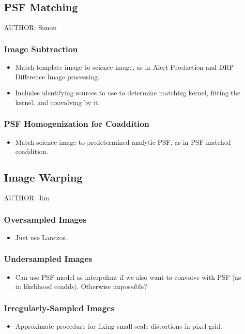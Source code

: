\subsection{PSF Matching}
AUTHOR: Simon
\subsubsection{Image Subtraction}
\begin{itemize}
\item Match template image to science image, as in Alert Production and DRP Difference Image processing.
\item Includes identifying sources to use to determine matching kernel, fitting the kernel, and convolving by it.
\end{itemize}
\subsubsection{PSF Homogenization for Coaddition}
\begin{itemize}
\item Match science image to predetermined analytic PSF, as in PSF-matched coaddition.
\end{itemize}

\subsection{Image Warping}
AUTHOR: Jim
\subsubsection{Oversampled Images}
\begin{itemize}
\item Just use Lanczos.
\end{itemize}
\subsubsection{Undersampled Images}
\begin{itemize}
\item Can use PSF model as interpolant if we also want to convolve with PSF (as in likelihood coadds).  Otherwise impossible?
\end{itemize}
\subsubsection{Irregularly-Sampled Images}
\begin{itemize}
\item Approximate procedure for fixing small-scale distortions in pixel grid.
\end{itemize}

